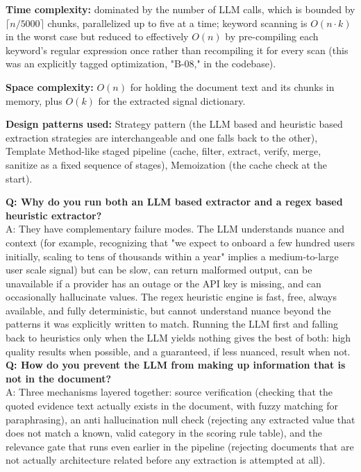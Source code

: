 \documentclass[11pt,a4paper]{report}
\begin{document}
\textbf{Time complexity:} dominated by the number of LLM calls, which is bounded by $\lceil n / 5000 \rceil$ chunks, parallelized up to five at a time; keyword scanning is $O(n \cdot k)$ in the worst case but reduced to effectively $O(n)$ by pre-compiling each keyword's regular expression once rather than recompiling it for every scan (this was an explicitly tagged optimization, "B-08," in the codebase).

\textbf{Space complexity:} $O(n)$ for holding the document text and its chunks in memory, plus $O(k)$ for the extracted signal dictionary.

\textbf{Design patterns used:} Strategy pattern (the LLM based and heuristic based extraction strategies are interchangeable and one falls back to the other), Template Method-like staged pipeline (cache, filter, extract, verify, merge, sanitize as a fixed sequence of stages), Memoization (the cache check at the start).

\begin{qabox}
\textbf{Q: Why do you run both an LLM based extractor and a regex based heuristic extractor?} \\
A: They have complementary failure modes. The LLM understands nuance and context (for example, recognizing that "we expect to onboard a few hundred users initially, scaling to tens of thousands within a year" implies a medium-to-large user scale signal) but can be slow, can return malformed output, can be unavailable if a provider has an outage or the API key is missing, and can occasionally hallucinate values. The regex heuristic engine is fast, free, always available, and fully deterministic, but cannot understand nuance beyond the patterns it was explicitly written to match. Running the LLM first and falling back to heuristics only when the LLM yields nothing gives the best of both: high quality results when possible, and a guaranteed, if less nuanced, result when not. \\[4pt]
\textbf{Q: How do you prevent the LLM from making up information that is not in the document?} \\
A: Three mechanisms layered together: source verification (checking that the quoted evidence text actually exists in the document, with fuzzy matching for paraphrasing), an anti hallucination null check (rejecting any extracted value that does not match a known, valid category in the scoring rule table), and the relevance gate that runs even earlier in the pipeline (rejecting documents that are not actually architecture related before any extraction is attempted at all).
\end{qabox}
\end{document}
